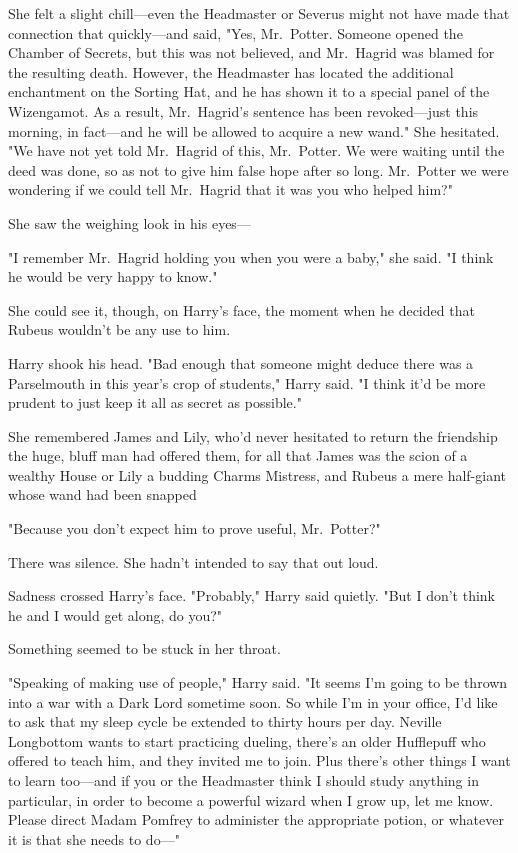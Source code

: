 She felt a slight chill---even the Headmaster or Severus might not have made
that connection that quickly---and said, "Yes, Mr.~Potter. Someone opened the
Chamber of Secrets, but this was not believed, and Mr.~Hagrid was blamed for
the resulting death. However, the Headmaster has located the additional
enchantment on the Sorting Hat, and he has shown it to a special panel of the
Wizengamot. As a result, Mr.~Hagrid's sentence has been revoked---just this
morning, in fact---and he will be allowed to acquire a new wand." She
hesitated. "We{\el} have not yet told Mr.~Hagrid of this, Mr.~Potter. We
were waiting until the deed was done, so as not to give him false hope after so
long. Mr.~Potter{\el} we were wondering if we could tell Mr.~Hagrid that it
was you who helped him{\el}?"

She saw the weighing look in his eyes---

"I remember Mr.~Hagrid holding you when you were a baby," she said. "I think he
would be very happy to know."

She could see it, though, on Harry's face, the moment when he decided that
Rubeus wouldn't be any use to him.

Harry shook his head. "Bad enough that someone might deduce there was a
Parselmouth in this year's crop of students," Harry said. "I think it'd be more
prudent to just keep it all as secret as possible."

She remembered James and Lily, who'd never hesitated to return the friendship
the huge, bluff man had offered them, for all that James was the scion of a
wealthy House or Lily a budding Charms Mistress, and Rubeus a mere half-giant
whose wand had been snapped{\el}

"Because you don't expect him to prove useful, Mr.~Potter?"

There was silence. She hadn't intended to say that out loud.

Sadness crossed Harry's face. "Probably," Harry said quietly. "But I don't
think he and I would get along, do you?"

Something seemed to be stuck in her throat.

"Speaking of making use of people," Harry said. "It seems I'm going to be
thrown into a war with a Dark Lord sometime soon. So while I'm in your office,
I'd like to ask that my sleep cycle be extended to thirty hours per day.
Neville Longbottom wants to start practicing dueling, there's an older
Hufflepuff who offered to teach him, and they invited me to join. Plus there's
other things I want to learn too---and if you or the Headmaster think I should
study anything in particular, in order to become a powerful wizard when I grow
up, let me know. Please direct Madam Pomfrey to administer the appropriate
potion, or whatever it is that she needs to do\mbox{---}"

